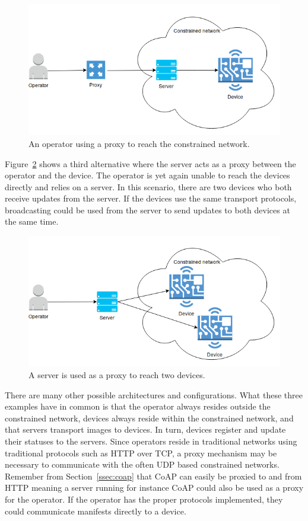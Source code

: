 \documentclass[0-thesis.tex]{subfiles}
\begin{document}
\begin{figure}
    \caption{An operator using a proxy to reach the constrained network.}
    \label{fig:operator-proxy}
    \includegraphics[scale=0.7]{images/operator-proxy.png}
\end{figure}

Figure~\ref{fig:operator-server} shows a third alternative where the server acts as a
proxy between the operator and the device. The operator is yet again unable to reach the
devices directly and relies on a server. In this scenario, there are two devices who both
receive updates from the server. If the devices use the same transport protocols,
broadcasting could be used from the server to send updates to both devices at the same
time.

\begin{figure}
    \caption{A server is used as a proxy to reach two devices.}
    \label{fig:operator-server}
    \includegraphics[scale=0.8]{images/operator-server.png}
\end{figure}

There are many other possible architectures and configurations. What these three examples
have in common is that the operator always resides outside the constrained network,
devices always reside within the constrained network, and that servers transport images to
devices. In turn, devices register and update their statuses to the servers. Since
operators reside in traditional networks using traditional protocols such as HTTP over
TCP, a proxy mechanism may be necessary to communicate with the often UDP based
constrained networks. Remember from Section~\ref{ssec:coap} that CoAP can easily be
proxied to and from HTTP meaning a server running for instance CoAP could also be used as
a proxy for the operator. If the operator has the proper protocols implemented, they could
communicate manifests directly to a device.
\end{document}
